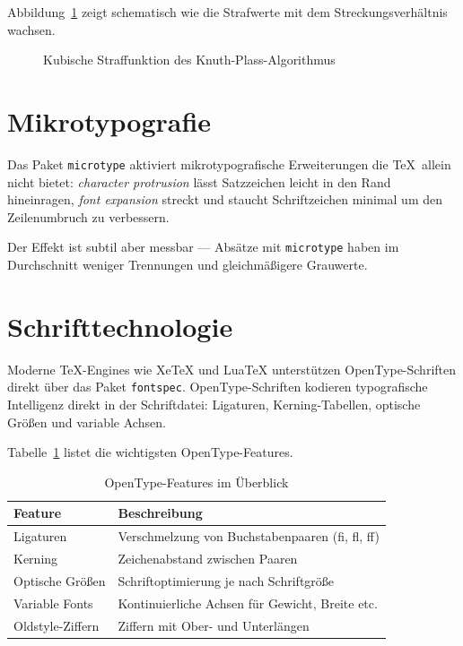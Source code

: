 \documentclass[
]{bfbook}
\begin{document}
Abbildung~\ref{fig:penalty} zeigt schematisch wie die Strafwerte mit
dem Streckungsverhältnis wachsen.

\begin{figure}[h]
\centering
{}
\caption{Kubische Straffunktion des Knuth-Plass-Algorithmus}
\label{fig:penalty}
\end{figure}

\section{Mikrotypografie}

Das Paket \texttt{microtype} aktiviert mikrotypografische Erweiterungen
die \TeX\ allein nicht bietet: \emph{character protrusion} lässt
Satzzeichen leicht in den Rand hineinragen, \emph{font expansion} streckt
und staucht Schriftzeichen minimal um den Zeilenumbruch zu verbessern.

Der Effekt ist subtil aber messbar — Absätze mit \texttt{microtype} haben
im Durchschnitt weniger Trennungen und gleichmäßigere Grauwerte.

\section{Schrifttechnologie}

Moderne \TeX-Engines wie XeTeX und LuaTeX unterstützen OpenType-Schriften
direkt über das Paket \texttt{fontspec}. OpenType-Schriften kodieren
typografische Intelligenz direkt in der Schriftdatei: Ligaturen,
Kerning-Tabellen, optische Größen und variable Achsen.

Tabelle~\ref{tab:fontfeatures} listet die wichtigsten OpenType-Features.

\begin{table}[h]
\centering
\caption{OpenType-Features im Überblick}
\label{tab:fontfeatures}
\begin{tabular}{ll}
\toprule
Feature & Beschreibung \\
\midrule
Ligaturen        & Verschmelzung von Buchstabenpaaren (fi, fl, ff) \\
Kerning          & Zeichenabstand zwischen Paaren \\
Optische Größen  & Schriftoptimierung je nach Schriftgröße \\
Variable Fonts   & Kontinuierliche Achsen für Gewicht, Breite etc. \\
Oldstyle-Ziffern & Ziffern mit Ober- und Unterlängen \\
\bottomrule
\end{tabular}
\end{table}
\end{document}
